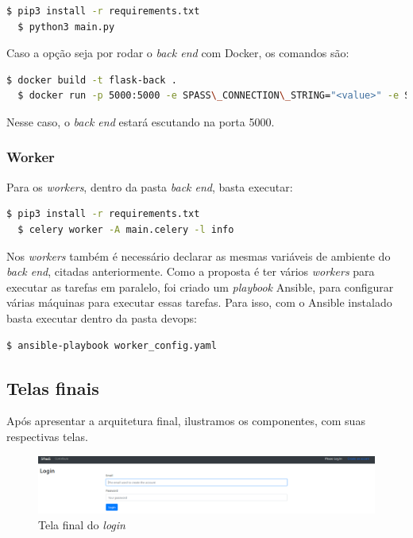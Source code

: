\documentclass[11pt,twoside]{article}
\begin{document}
\begin{lstlisting}[language=bash]
  $ pip3 install -r requirements.txt
  $ python3 main.py
\end{lstlisting}

Caso a opção seja por rodar o \emph{back end} com Docker, os comandos são:

\begin{lstlisting}[language=bash]
  $ docker build -t flask-back .
  $ docker run -p 5000:5000 -e SPASS\_CONNECTION\_STRING="<value>" -e SPASS\_DATA\_BLOB\_KEY="<value>" -e SPASS\_CELERY\_BROKER="<value>" flask-back
\end{lstlisting}

Nesse caso, o \emph{back end} estará escutando na porta 5000.

\subsubsection{Worker}

Para os \emph{workers}, dentro da pasta \emph{back end}, basta executar:

\begin{lstlisting}[language=bash]
  $ pip3 install -r requirements.txt
  $ celery worker -A main.celery -l info
\end{lstlisting}

Nos \emph{workers} também é necessário declarar as mesmas variáveis de ambiente do \emph{back end}, citadas anteriormente. 
Como a proposta é ter vários \emph{workers} para executar as tarefas em paralelo, foi criado um \emph{playbook} Ansible, para configurar várias máquinas para 
executar essas tarefas. Para isso, com o Ansible instalado basta executar dentro da pasta devops:

\begin{lstlisting}[language=bash]
  $ ansible-playbook worker_config.yaml
\end{lstlisting}

\subsection{Telas finais}

Após apresentar a arquitetura final, ilustramos os componentes, com suas respectivas telas. 

\begin{figure}[!h]
  \centering
  \includegraphics[scale=0.3]{final_login.eps}
  \caption{Tela final do \emph{login}}
  \label{fig:finalLogin}
\end{figure}
\end{document}
